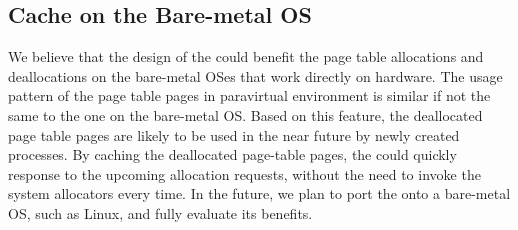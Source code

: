
\subsection{\name Cache on the Bare-metal OS}
We believe that the design of the \cache could benefit the page table allocations and deallocations on the bare-metal OSes that work directly on hardware.
The usage pattern of the page table pages in paravirtual environment is similar if not the same to the one on the bare-metal OS.
Based on this feature, the deallocated page table pages are likely to be used in the near future by newly created processes.
By caching the deallocated page-table pages, the \cache could quickly response to the upcoming allocation requests, without the need to invoke the system allocators every time.
In the future, we plan to port the \cache onto a bare-metal OS, such as Linux, and fully evaluate its benefits.
